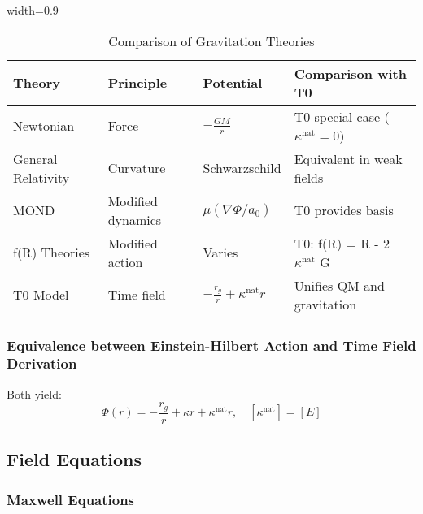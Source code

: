 ﻿\documentclass[12pt,a4paper]{article}
\newcommand{\tablescale}{0.9}
\begin{document}
\begin{itemize}
	\begin{table}[htbp]
		\centering
		\begin{adjustbox}{width=\tablescale\textwidth}
			\begin{tabular}{p{3cm}p{3cm}p{4cm}p{4cm}}
				\toprule
				\textbf{Theory} & \textbf{Principle} & \textbf{Potential} & \textbf{Comparison with T0} \\
				\midrule
				Newtonian & Force & \(-\frac{G M}{r}\) & T0 special case (\(\kappa^{\text{nat}} = 0\)) \\
				General Relativity & Curvature & Schwarzschild & Equivalent in weak fields \\
				MOND & Modified dynamics & \(\mu(\nabla \Phi/a_0)\) & T0 provides basis \\
				f(R) Theories & Modified action & Varies & T0: f(R) = R - 2\(\kappa^{\text{nat}}\) G \\
				T0 Model & Time field & \(-\frac{r_g}{r} + \kappa^{\text{nat}} r\) & Unifies QM and gravitation \\
				\bottomrule
			\end{tabular}
		\end{adjustbox}
		\caption{Comparison of Gravitation Theories}
		\label{tab:theory_comparison}
	\end{table}
	
	\subsubsection{Equivalence between Einstein-Hilbert Action and Time Field Derivation}
	Both yield:
	\[
	\Phi(r) = -\frac{r_g}{r} + \kappa r + \kappa^{\text{nat}} r, \quad [\kappa^{\text{nat}}] = [E]
	\]
	
	\subsection{Field Equations}
	\label{sec:field_equations}
	
	\subsubsection{Maxwell Equations}
	\label{subsec:maxwell}
	

\end{itemize}
\end{document}
